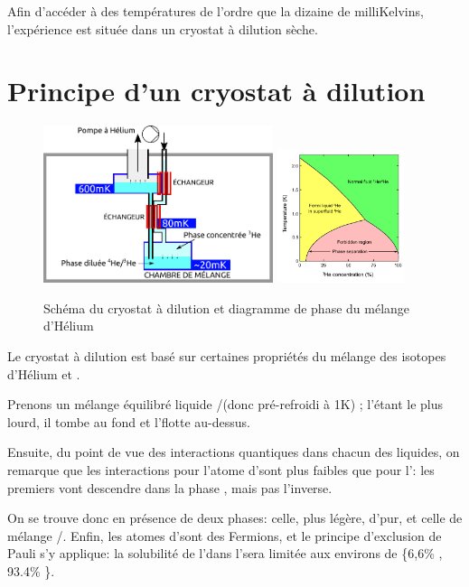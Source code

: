 Afin d'accéder à des températures de l'ordre que la dizaine de milliKelvins, l'expérience est située dans un cryostat à dilution sèche.
\section{Principe d'un cryostat à dilution}
\begin{figure}[h]
  \begin{center}
    \includegraphics[width=0.6\textwidth]{Images/Cryostat_Schema.pdf}
    \qquad
    \includegraphics[width=0.33\textwidth]{Images/Helium_phase_diagram.pdf}
    \caption{Schéma du cryostat à dilution et diagramme de phase du mélange d'Hélium}
  \end{center}
\end{figure}
Le cryostat à dilution est basé sur certaines propriétés du mélange des isotopes d'Hélium \HeT et \HeQ.
\par

Prenons un mélange équilibré liquide \HeT/\HeQ(donc pré-refroidi à 1K) ; l'\HeQ étant le plus lourd, il tombe au fond et l'\HeT flotte au-dessus.

Ensuite, du point de vue des interactions quantiques dans chacun des liquides, on remarque que les interactions pour l'atome d'\HeT sont plus faibles que pour l'\HeQ : les premiers vont descendre dans la phase \HeQ, mais pas l'inverse.
\par

On se trouve donc en présence de deux phases: celle, plus légère, d'\HeT pur, et celle de mélange \HeT/\HeQ.
Enfin, les atomes d'\HeT sont des Fermions, et le principe d'exclusion de Pauli s'y applique: la solubilité de l'\HeT dans l'\HeQ sera limitée aux environs de \{6,6\% \HeT, 93.4\% \HeQ\}.
\par

